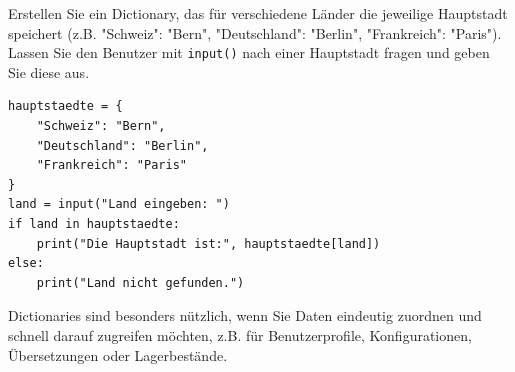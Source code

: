 \begin{myexercise}
Erstellen Sie ein Dictionary, das für verschiedene Länder die jeweilige Hauptstadt speichert (z.B. "Schweiz": "Bern", "Deutschland": "Berlin", "Frankreich": "Paris"). Lassen Sie den Benutzer mit \lstinline|input()| nach einer Hauptstadt fragen und geben Sie diese aus.

\begin{myanswer}
\begin{lstlisting}
hauptstaedte = {
    "Schweiz": "Bern",
    "Deutschland": "Berlin",
    "Frankreich": "Paris"
}
land = input("Land eingeben: ")
if land in hauptstaedte:
    print("Die Hauptstadt ist:", hauptstaedte[land])
else:
    print("Land nicht gefunden.")
\end{lstlisting}
\end{myanswer}
\end{myexercise}

Dictionaries sind besonders nützlich, wenn Sie Daten eindeutig zuordnen und schnell darauf zugreifen möchten, z.B. für Benutzerprofile, Konfigurationen, Übersetzungen oder Lagerbestände.